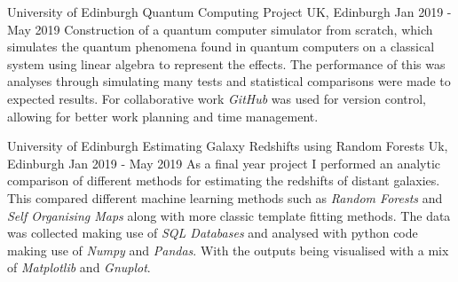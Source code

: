 \begin{cventries}
    \cventry
        {University of Edinburgh}
        {Quantum Computing Project}
        {UK, Edinburgh}
        {Jan 2019 - May 2019}
        {
         Construction of a quantum computer simulator from scratch, which simulates the quantum phenomena found in quantum computers on a classical system using linear algebra to represent the effects. The performance of this was analyses through simulating many tests and statistical comparisons were made to expected results. For collaborative work \textit{GitHub} was used for version control, allowing for better work planning and time management.
        }
        
    \cventry
    {University of Edinburgh}
    {Estimating Galaxy Redshifts using Random Forests}
    {Uk, Edinburgh}
    {Jan 2019 - May 2019}
     {%
     As a final year project I performed an analytic comparison of different methods for estimating the redshifts of distant galaxies. This compared different machine learning methods such as \textit{Random Forests} and \textit{Self Organising Maps} along with more classic template fitting methods. The data was collected making use of \textit{SQL Databases} and analysed with python code making use of \textit{Numpy} and \textit{Pandas}. With the outputs being visualised with a mix of \textit{Matplotlib} and \textit{Gnuplot}.}
    

\end{cventries}
